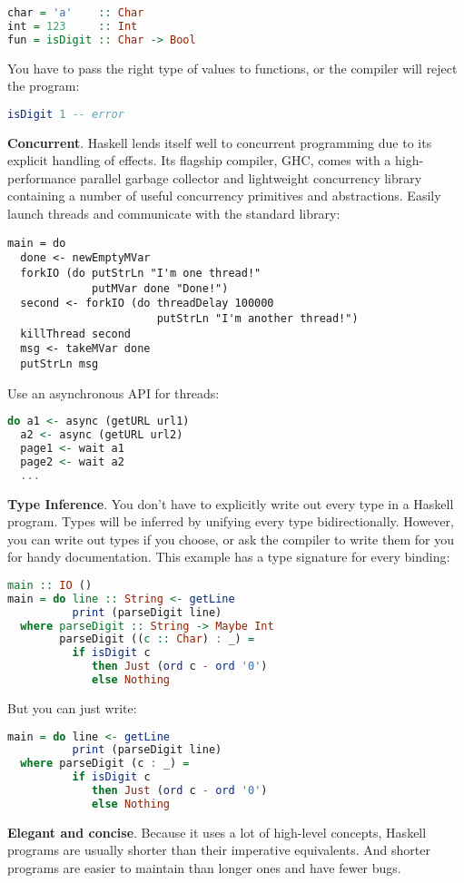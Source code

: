 \begin{lstlisting}[language=Haskell, caption=Statically Typed]
char = 'a'    :: Char
int = 123     :: Int
fun = isDigit :: Char -> Bool
\end{lstlisting}
You have to pass the right type of values to functions, or the compiler will reject the program:
\begin{lstlisting}[language=Haskell, caption=Statically Typed]
isDigit 1 -- error
\end{lstlisting}
\textbf{Concurrent}. Haskell lends itself well to concurrent programming due to its explicit handling of effects. Its flagship compiler, GHC, comes with a high-performance parallel garbage collector and lightweight concurrency library containing a number of useful concurrency primitives and abstractions. Easily launch threads and communicate with the standard library:
\begin{lstlisting}[caption=Concurrent]
main = do
  done <- newEmptyMVar
  forkIO (do putStrLn "I'm one thread!"
             putMVar done "Done!")
  second <- forkIO (do threadDelay 100000
                       putStrLn "I'm another thread!")
  killThread second
  msg <- takeMVar done
  putStrLn msg
\end{lstlisting}
Use an asynchronous API for threads:
\begin{lstlisting}[language=Haskell, caption=Concurrent]
do a1 <- async (getURL url1)
  a2 <- async (getURL url2)
  page1 <- wait a1
  page2 <- wait a2
  ...
\end{lstlisting}
\textbf{Type Inference}. You don't have to explicitly write out every type in a Haskell program. Types will be inferred by unifying every type bidirectionally. However, you can write out types if you choose, or ask the compiler to write them for you for handy documentation. This example has a type signature for every binding:
\begin{lstlisting}[language=Haskell, caption=Type Inference]
main :: IO ()
main = do line :: String <- getLine
          print (parseDigit line)
  where parseDigit :: String -> Maybe Int
        parseDigit ((c :: Char) : _) =
          if isDigit c
             then Just (ord c - ord '0')
             else Nothing
\end{lstlisting}
But you can just write:
\begin{lstlisting}[language=Haskell, caption=Type Inference]
main = do line <- getLine
          print (parseDigit line)
  where parseDigit (c : _) =
          if isDigit c
             then Just (ord c - ord '0')
             else Nothing
\end{lstlisting}
\textbf{Elegant and concise}. Because it uses a lot of high-level concepts, Haskell programs are usually shorter than their imperative equivalents. And shorter programs are easier to maintain than longer ones and have fewer bugs.

